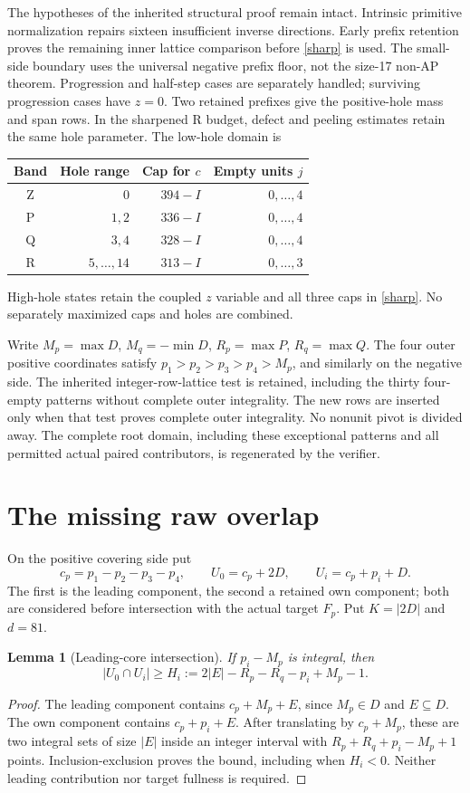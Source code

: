 \documentclass[11pt,a4paper]{article}
\newtheorem{lemma}[theorem]{Lemma}
\begin{document}
The hypotheses of the inherited structural proof remain intact.
Intrinsic primitive normalization repairs sixteen insufficient inverse
directions. Early prefix retention proves the remaining inner lattice
comparison before \eqref{sharp} is used. The small-side boundary uses
the universal negative prefix floor, not the size-17 non-AP theorem.
Progression and half-step cases are separately handled; surviving
progression cases have $z=0$. Two retained prefixes give the positive-hole
mass and span rows. In the sharpened R budget, defect and peeling
estimates retain the same hole parameter. The low-hole domain is
\begin{center}
\begin{tabular}{crrr}\toprule
Band&Hole range&Cap for $c$&Empty units $j$\\\midrule
Z&$0$&$394-I$&$0,\ldots,4$\\
P&$1,2$&$336-I$&$0,\ldots,4$\\
Q&$3,4$&$328-I$&$0,\ldots,4$\\
R&$5,\ldots,14$&$313-I$&$0,\ldots,3$\\\bottomrule
\end{tabular}
\end{center}
High-hole states retain the coupled $z$ variable and all three caps
in \eqref{sharp}. No separately maximized caps and holes are combined.

Write $M_p=\max D$, $M_q=-\min D$, $R_p=\max P$, $R_q=\max Q$.
The four outer positive coordinates satisfy
$p_1>p_2>p_3>p_4>M_p$, and similarly on the negative side.
The inherited integer-row-lattice test is retained, including the thirty
four-empty patterns without complete outer integrality. The new rows are
inserted only when that test proves complete outer integrality. No
nonunit pivot is divided away. The complete root domain, including these
exceptional patterns and all permitted actual paired contributors, is
regenerated by the verifier.

\section{The missing raw overlap}
On the positive covering side put
\[
 c_p=p_1-p_2-p_3-p_4,\qquad
 U_0=c_p+2D,\qquad U_i=c_p+p_i+D.
\]
The first is the leading component, the second a retained own component;
both are considered before intersection with the actual target $F_p$.
Put $K=|2D|$ and $d=81$.

\begin{lemma}[Leading-core intersection]\label{intersection}
If $p_i-M_p$ is integral, then
\[
 |U_0\cap U_i|\ge H_i:=2|E|-R_p-R_q-p_i+M_p-1.
\]
\end{lemma}
\begin{proof}
The leading component contains $c_p+M_p+E$, since $M_p\in D$ and
$E\subseteq D$. The own component contains $c_p+p_i+E$.
After translating by $c_p+M_p$, these are two integral sets of size $|E|$
inside an integer interval with $R_p+R_q+p_i-M_p+1$ points.
Inclusion-exclusion proves the bound, including when $H_i<0$.
Neither leading contribution nor target fullness is required.
\end{proof}
\end{document}
